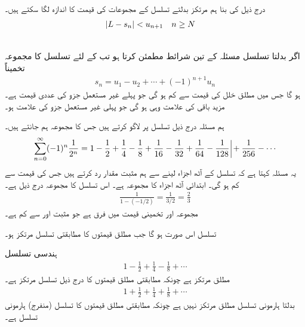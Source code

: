 درج ذیل کی بنا ہم مرتکز بدلتے تسلسل کے مجموعات کی قیمت  کا اندازہ  لگا سکتے ہیں۔
\begin{align*}
\abs{L-s_n}&<u_{n+1}&&n\ge N
\end{align*}

\\
اگر بدلتا تسلسل  مسئلہ  کے تین شرائط مطمئن کرتا ہو تب  کے لئے  تسلسل کا مجموعہ  تخمیناً
\begin{align*}
s_n=u_1-u_2+\cdots+(-1)^{n+1}u_n
\end{align*}
ہو گا جس میں مطلق خلل کی قیمت  سے کم ہو گی جو پہلے غیر مستعمل جزو کی عددی قیمت ہے۔ مزید باقی  کی علامت وہی ہو گی جو پہلی غیر مستعمل جزو کی علامت ہو۔ 

ہم مسئلہ  درج ذیل تسلسل پر لاگو کرتے ہیں جس کا مجموعہ ہم جانتے ہیں۔
\begin{align*}
\sum_{n=0}^{\infty}(-1)^n\frac{1}{2^n}=1-\frac{1}{2}+\frac{1}{4}-\frac{1}{8}+\frac{1}{16}-\frac{1}{32}+\frac{1}{64}-\frac{1}{128}\,\protect\rule[-2ex]{0.1ex}{5ex}+\frac{1}{256}-\cdots
\end{align*}
یہ مسئلہ کہتا ہے کہ تسلسل کے آٹھ اجزاء لینے سے ہم  مثبت مقدار رد کرتے ہیں جس کی قیمت  سے کم ہو گی۔ ابتدائی آٹھ اجزاء کا مجموعہ  ہے۔ اس تسلسل کا مجموعہ درج ذیل ہے۔
\begin{align*}
\frac{1}{1-(-1/2)}=\frac{1}{3/2}=\frac{2}{3}
\end{align*}
مجموعہ اور تخمینی قیمت میں فرق  ہے جو مثبت اور  سے کم ہے۔

تسلسل  اس صورت  ہو گا جب مطلق قیمتوں کا مطابقتی تسلسل  مرتکز ہو۔

ہندسی تسلسل
\begin{align*}
1-\frac{1}{2}+\frac{1}{4}-\frac{1}{8}+\cdots
\end{align*}
مطلق مرتکز ہے چونکہ مطابقتی مطلق قیمتوں کا درج ذیل تسلسل مرتکز ہے۔
\begin{align*}
1+\frac{1}{2}+\frac{1}{4}+\frac{1}{8}+\cdots
\end{align*}
بدلتا ہارمونی تسلسل مطلق مرتکز نہیں ہے چونکہ مطابقتی مطلق قیمتوں کا تسلسل (منفرج) ہارمونی تسلسل ہے۔

